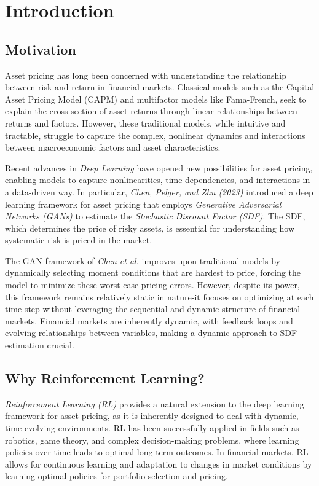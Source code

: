 \section{Introduction}

\subsection{Motivation}

Asset pricing has long been concerned with understanding the relationship between risk and return in financial markets. Classical models such as the Capital Asset Pricing Model (CAPM) and multifactor models like Fama-French, seek to explain the cross-section of asset returns through linear relationships between returns and factors. However, these traditional models, while intuitive and tractable, struggle to capture the complex, nonlinear dynamics and interactions between macroeconomic factors and asset characteristics.

Recent advances in \textit{Deep Learning} have opened new possibilities for asset pricing, enabling models to capture nonlinearities, time dependencies, and interactions in a data-driven way. In particular, \textit{Chen, Pelger, and Zhu (2023)} introduced a deep learning framework for asset pricing that employs \textit{Generative Adversarial Networks (GANs)} to estimate the \textit{Stochastic Discount Factor (SDF)}. The SDF, which determines the price of risky assets, is essential for understanding how systematic risk is priced in the market.

The GAN framework of \textit{Chen et al.} improves upon traditional models by dynamically selecting moment conditions that are hardest to price, forcing the model to minimize these worst-case pricing errors. However, despite its power, this framework remains relatively static in nature-it focuses on optimizing at each time step without leveraging the sequential and dynamic structure of financial markets. Financial markets are inherently dynamic, with feedback loops and evolving relationships between variables, making a dynamic approach to SDF estimation crucial.

\subsection{Why Reinforcement Learning?}

\textit{Reinforcement Learning (RL)} provides a natural extension to the deep learning framework for asset pricing, as it is inherently designed to deal with dynamic, time-evolving environments. RL has been successfully applied in fields such as robotics, game theory, and complex decision-making problems, where learning policies over time leads to optimal long-term outcomes. In financial markets, RL allows for continuous learning and adaptation to changes in market conditions by learning optimal policies for portfolio selection and pricing.


